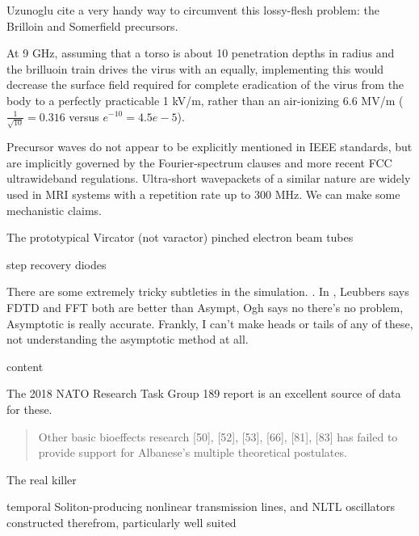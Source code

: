 \documentclass[paper.tex]{subfiles}
\begin{document}
Uzunoglu \cite{Theoretical2020} cite a very handy way to circumvent this lossy-flesh problem: the Brilloin and Somerfield precursors.



At 9 GHz, assuming that a torso is about 10 penetration depths in radius and the brilluoin train drives the virus with an equally, implementing this would decrease the surface field required for complete eradication of the virus from the body to a perfectly practicable 1 kV/m, rather than an air-ionizing 6.6 MV/m ($\frac{1}{\sqrt{10}}=0.316$ versus $e^{-10}=4.5e-5$). 



Precursor waves do not appear to be explicitly mentioned in IEEE standards, but are implicitly governed by the Fourier-spectrum clauses and more recent FCC ultrawideband regulations. Ultra-short wavepackets of a similar nature are widely used in MRI systems with a repetition rate up to 300 MHz. We can make some mechanistic claims.



The prototypical Vircator (not varactor) pinched electron beam tubes 

step recovery diodes

\begin{sidenote}
There are some extremely tricky subtleties in the simulation.  \cite{propagation1992}. In \cite{Comments1993}, Leubbers says FDTD and FFT both are better than Asympt, Ogh says no there's no problem, Asymptotic is really accurate. Frankly, I can't make heads or tails of any of these, not understanding the asymptotic method at all.
\end{sidenote}
\begin{tab}
	content
\end{tab}

The 2018 NATO Research Task Group 189 report \cite{treatyelectromagnetic} is an excellent source of data for these. 

\begin{quote}
	Other basic bioeffects research [50], [52], [53], [66], [81], [83] has failed to provide support for Albanese’s multiple	theoretical postulates.
\end{quote}

The real killer 





temporal Soliton-producing nonlinear transmission lines, and NLTL oscillators constructed therefrom, particularly well suited 
\end{document}
